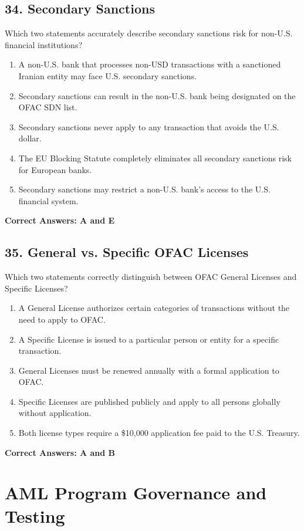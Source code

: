 \documentclass[11pt,a4paper]{article}
\begin{document}
	\subsection{34. Secondary Sanctions}
	Which two statements accurately describe secondary sanctions risk for non-U.S. financial institutions?
	\begin{enumerate}[label=\Alph*.]
		\item A non-U.S. bank that processes non-USD transactions with a sanctioned Iranian entity may face U.S. secondary sanctions.
		\item Secondary sanctions can result in the non-U.S. bank being designated on the OFAC SDN list.
		\item Secondary sanctions never apply to any transaction that avoids the U.S. dollar.
		\item The EU Blocking Statute completely eliminates all secondary sanctions risk for European banks.
		\item Secondary sanctions may restrict a non-U.S. bank's access to the U.S. financial system.
	\end{enumerate}
	\textbf{Correct Answers: A and E}
	
	\subsection{35. General vs. Specific OFAC Licenses}
	Which two statements correctly distinguish between OFAC General Licenses and Specific Licenses?
	\begin{enumerate}[label=\Alph*.]
		\item A General License authorizes certain categories of transactions without the need to apply to OFAC.
		\item A Specific License is issued to a particular person or entity for a specific transaction.
		\item General Licenses must be renewed annually with a formal application to OFAC.
		\item Specific Licenses are published publicly and apply to all persons globally without application.
		\item Both license types require a \$10,000 application fee paid to the U.S. Treasury.
	\end{enumerate}
	\textbf{Correct Answers: A and B}
	
	\section{AML Program Governance and Testing}
	
\end{document}
